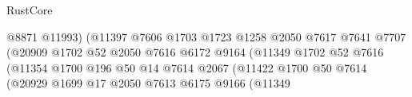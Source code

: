 \begin{lexlean}{RustCore}
\begin{coremodule}
                                                      @8871
                                                      @11993)
                                                    (@11397
                                                      @7606
                                                      @1703
                                                      @1723
                                                      @1258
                                                      @2050
                                                      @7617
                                                      @7641
                                                      @7707
                                                      (@20909
                                                        @1702
                                                        @52
                                                        @2050
                                                        @7616
                                                        @6172
                                                        @9164
                                                        (@11349
                                                          @1702
                                                          @52
                                                          @7616
                                                          (@11354
                                                            @1700
                                                            @196
                                                            @50
                                                            @14
                                                            @7614
                                                            @2067
                                                            (@11422
                                                              @1700
                                                              @50
                                                              @7614
                                                              (@20929
                                                                @1699
                                                                @17
                                                                @2050
                                                                @7613
                                                                @6175
                                                                @9166
                                                                (@11349

\end{coremodule}
\end{lexlean}
